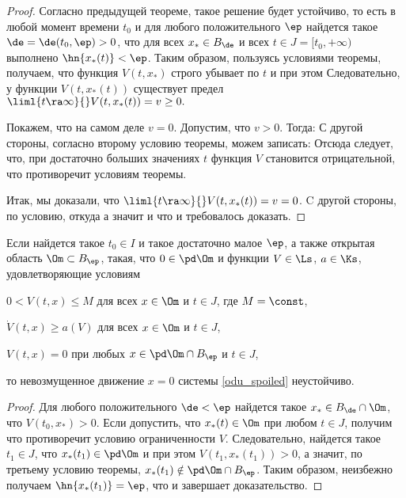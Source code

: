 \documentclass[a4paper,12pt]{article}
\def\xtrpicturep#1#2{\vadjust{\vbox{%
\vskip.5pc
\centerline{\epsfbox{pictures.#1}}
\vskip2pt
\centerline{\footnotesize\normalfont\textbf{Рис.~#2}}
\vskip.5pc}}}
\begin{document}
\begin{proof}
Согласно предыдущей теореме, такое решение будет устойчиво, то есть в любой момент времени $t_0$ и
для любого положительного $\ep$ найдется такое $\de=\de(t_0,\ep)>0$, что
для всех $x_*\in B_\de$ и всех $t\in J=[t_0,+\infty)$ выполнено $\hn{x_*(t)}<\ep$.
Таким образом, пользуясь условиями
теоремы, получаем, что функция $V(t,x_*)$ строго убывает по $t$ и при этом  Следовательно, у функции $V(t,x_*(t))$ существует предел
$\liml{t\ra\infty}{}V(t,x_*(t))=v\ge0.$

Покажем, что на самом деле $v=0$. Допустим, что $v>0$. Тогда:
С другой стороны, согласно второму
условию теоремы, можем записать:
Отсюда следует, что, при достаточно больших значениях $t$ функция $V$
становится отрицательной, что противоречит условиям теоремы.

Итак, мы доказали, что $\liml{t\ra\infty}{}V(t,x_*(t))=v=0$. C другой стороны, по условию,
откуда
 а значит и
что и требовалось доказать.
\end{proof}

\begin{theorem}[Н.\,Г.\,Четаев]
Если найдется такое $t_0\in I$ и такое достаточно малое $\ep$,
а также открытая область $\Om\subset B_\ep$, такая, что
$0\in\pd\Om$ и функции $V\in\Ls$, $a\in\Ks$,
удовлетворяющие условиям
\xtrpicturep{7}{7}
\begin{nums}{-2}
  \item $0<V(t,x)\le M$ для всех $x\in\Om$ и $t\in J$, где $M = \const$,
  \item $\dot{V}(t,x)\ge a(V)$ для всех $x\in\Om$ и $t\in J$,
  \item $V(t,x)=0$ при любых $x\in\pd\Om\cap B_{\ep}$ и $t\in J$,
\end{nums}
то невозмущенное движение $x=0$ системы \eqref{odu_spoiled} неустойчиво.
\end{theorem}
\begin{proof}
Для любого положительного $\de<\ep$ найдется такое $x_*\in B_{\de}\cap\Om$, что
$V(t_0,x_*)>0$. Если допустить, что $x_*(t)\in\Om$ при любом $t\in J$, получим
 что противоречит условию ограниченности $V$. Следовательно,
найдется такое $t_1\in J$, что $x_*(t_1)\in\pd\Om$ и при этом $V(t_1,x_*(t_1))>0$, а
значит, по третьему условию теоремы, $x_*(t_1)\notin\pd\Om\cap B_{\ep}$. Таким образом,
неизбежно получаем $\hn{x_*(t_1)}=\ep$, что и завершает доказательство.
\end{proof}
\end{document}
